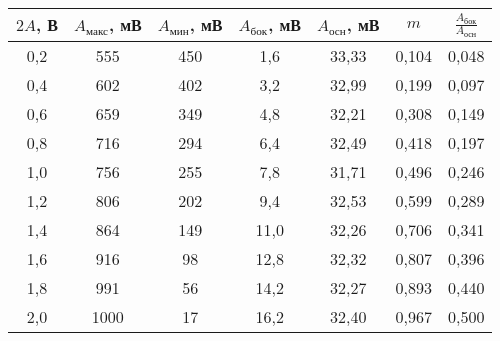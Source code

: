 \begin{tabular}{ccccccc}
\toprule
$2A$, В & $A_\text{макс}$, мВ & $A_\text{мин}$, мВ & $A_\text{бок}$, мВ & $A_\text{осн}$, мВ & $m$ & $\frac{A_\text{бок}}{A_\text{осн}}$\\
\midrule
0,2 & 555 & 450 & 1,6 & 33,33 & 0,104 & 0,048 \\
0,4 & 602 & 402 & 3,2 & 32,99 & 0,199 & 0,097 \\
0,6 & 659 & 349 & 4,8 & 32,21 & 0,308 & 0,149 \\
0,8 & 716 & 294 & 6,4 & 32,49 & 0,418 & 0,197 \\
1,0 & 756 & 255 & 7,8 & 31,71 & 0,496 & 0,246 \\
1,2 & 806 & 202 & 9,4 & 32,53 & 0,599 & 0,289 \\
1,4 & 864 & 149 & 11,0& 32,26 & 0,706 & 0,341 \\
1,6 & 916 & 98  & 12,8& 32,32 & 0,807 & 0,396 \\
1,8 & 991 & 56  & 14,2& 32,27 & 0,893 & 0,440 \\
2,0 & 1000& 17	& 16,2& 32,40 & 0,967 & 0,500 \\	
\bottomrule
\end{tabular}

